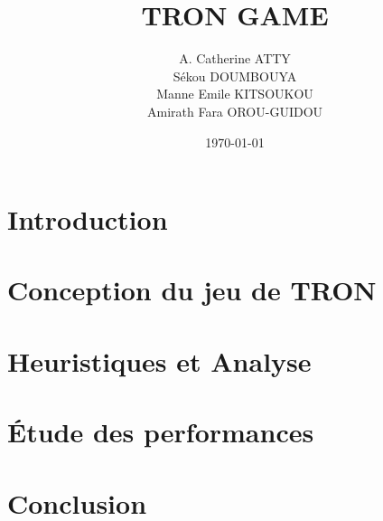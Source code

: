 \documentclass{beamer}
\title{TRON GAME}
\author[A. Catherine ATTY \\  Sékou DOUMBOUYA \\ Manne Emile KITSOUKOU \\ Amirath Fara OROU-GUIDOU]{A. Catherine ATTY \\  Sékou DOUMBOUYA \\ Manne Emile KITSOUKOU \\ Amirath Fara OROU-GUIDOU}
\institute[Université de Caen Normandie]{Université de Caen Normandie}
\date{\today}
\begin{document}
    \begin{frame}
        \titlepage
    \end{frame}
    
    \section*{Introduction}
    

    \section{Conception du jeu de TRON}
    

    \section{Heuristiques et Analyse}
    

    \section{Étude des performances}
    

    \section{Conclusion}
    
\end{document}
